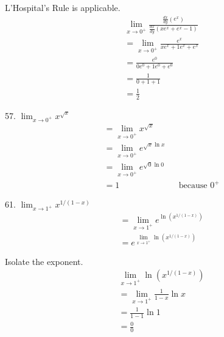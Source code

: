 \documentclass{article}
\begin{document}
\begin{description}
\begin{description}
                L'Hospital's Rule is applicable.
                \begin{align*}
                   & \lim_{x\to0^+}\frac{\frac{dx}{dy}(e^x)}{\frac{dx}{dy}(xe^x + e^x -1)} \\[1em]
                   & = \lim_{x\to0^+}\frac{e^x}{xe^x + 1e^x + e^x}                         \\[1em]
                   & = \frac{e^0}{0e^0 + 1e^0 + e^0}                                       \\[1em]
                   & = \frac{1}{0 + 1 + 1}                                                 \\[1em]
                   & = \boxed{\frac{1}{2}}
                \end{align*}
          \item 57. $\lim_{x\to0^+}x^{\sqrt{x}}$
                \begin{align*}
                   & = \lim_{x\to0^+}x^{\sqrt{x}}                                \\[1em]
                   & = \lim_{x\to0^+}e^{\sqrt{x}\ln{x}}                          \\[1em]
                   & = \lim_{x\to0^+}e^{\sqrt{0}\ln{0}}                          \\[1em]
                   & = \boxed{1}                        &  & \text{because } 0^+
                \end{align*}
          \item 61. $\lim_{x\to1^+}x^{1/(1-x)}$
                \begin{align*}
                   & =  \lim_{x\to1^+} e^{\ln(x^{1/(1-x)})} \\[1em]
                   & =   e^{\lim_{x\to1^+}\ln(x^{1/(1-x)})}
                \end{align*}

                Isolate the exponent.
                \begin{align*}
                   & \lim_{x\to1^+}\ln{(x^{1/(1-x)})}      \\[1em]
                   & =   \lim_{x\to1^+}\frac{1}{1-x}\ln{x} \\[1em]
                   & =   \frac{1}{1-1}\ln{1}               \\[1em]
                   & =   \frac{0}{0}
                \end{align*}


\end{description}
\end{description}
\end{document}
